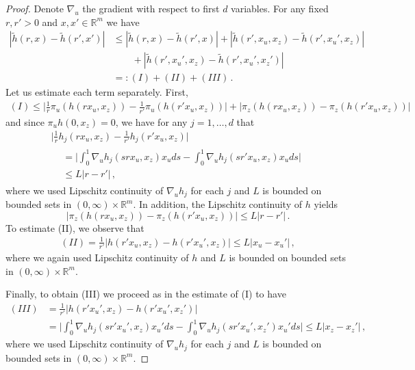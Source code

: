 \documentclass[final]{amsart}
\numberwithin{thm}{section}
\numberwithin{equation}{section}
\newcommand{\R}{\mathbb{R}}
\begin{document}
\begin{proof}
Denote $\nabla_u$ the gradient with respect to first $d$ variables. 
For any fixed $r, r' > 0$ and $x, x' \in \R^m$ we have 
\begin{align*}
    |\tilde{h}(r, x) - \tilde{h}(r', x')| &\leq 
    |\tilde{h}(r, x) - \tilde{h}(r', x)| + 
    |\tilde{h}(r', x_u, x_z) - \tilde{h}(r', x_u', x_z)| \\
    & \qquad +
    |\tilde{h}(r', x_u', x_z) - \tilde{h}(r', x_u', x_z')|
    \\
    &=: (I) + (II) + (III) \,.
\end{align*}
Let us estimate each term separately. First, 
\begin{align*}
    (I) \leq \Big|\frac{1}{r} \pi_u(h(rx_u, x_z))- \frac{1}{r'} \pi_u(h(r'x_u, x_z)) \Big| + |\pi_z(h(rx_u, x_z)) - \pi_z(h(r'x_u, x_z))| 
\end{align*}
and since $\pi_u h(0, x_z) = 0$, we have for any $j = 1, \ldots, d$ that
\begin{multline*}
\Big|\frac{1}{r} h_j(rx_u, x_z) - \frac{1}{r'} h_j(r'x_u, x_z)\Big| \\ 
\begin{aligned}
&=
\Big|\int_0^1 \nabla_u h_j(srx_u, x_z) x_u ds -
\int_0^1 \nabla_u h_j(sr'x_u, x_z) x_u ds\Big|  \\
&\leq L |r - r'| \,,
\end{aligned}
\end{multline*}
where we used Lipschitz continuity of $\nabla_u h_j$ for each $j$ and $L$ is bounded on bounded sets in $(0, \infty) \times \R^m$. 
In addition, the Lipschitz continuity of $h$ yields
\begin{equation*}
|\pi_z(h(rx_u, x_z)) - \pi_z(h(r'x_u, x_z))| \leq L|r - r'| \,.   
\end{equation*}
To estimate (II), we observe that 
\begin{align*}
 (II)
 = \frac{1}{r'} |h(r'x_u, x_z) - h(r'x_u', x_z)| \leq L|x_u - x_u'|\,,
\end{align*}
where we again used Lipschitz continuity of $h$ and $L$ is bounded on bounded sets in $(0, \infty) \times \R^m$. 

Finally, to obtain (III) we proceed as in the estimate of (I) to have
\begin{align*}
    (III) &= \frac{1}{r'} |h(r'x_u', x_z) - h(r'x_u', x_z')|
    \\
    &= \Big|\int_0^1 \nabla_u h_j(sr'x_u', x_z) x_u' ds -
\int_0^1 \nabla_u h_j(sr'x_u', x_z') x_u' ds\Big|
\leq L|x_z - x_z'| \,,
\end{align*}
where we used Lipschitz continuity of $\nabla_u h_j$ for each $j$ and $L$ is bounded on bounded sets in $(0, \infty) \times \R^m$. 


\end{proof}
\end{document}
